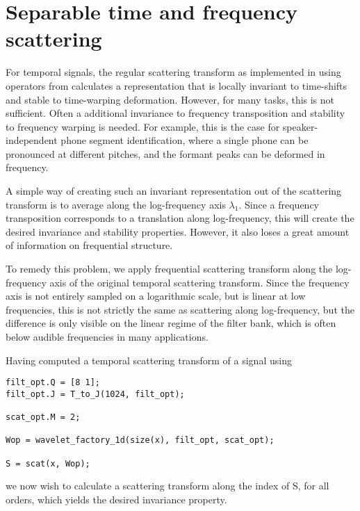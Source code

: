 \documentclass{article}
\begin{document}
\section{Separable time and frequency scattering}
\label{sec:separable-tf}

For temporal signals, the regular scattering transform as implemented in  using operators  from  calculates a representation that is locally invariant to time-shifts and stable to time-warping deformation. However, for many tasks, this is not sufficient. Often a additional invariance to frequency transposition and stability to frequency warping is needed. For example, this is the case for speaker-independent phone segment identification, where a single phone can be pronounced at different pitches, and the formant peaks can be deformed in frequency.

A simple way of creating such an invariant representation out of the scattering transform is to average along the log-frequency axis $\lambda_1$. Since a frequency transposition corresponds to a translation along log-frequency, this will create the desired invariance and stability properties. However, it also loses a great amount of information on frequential structure.

To remedy this problem, we apply frequential scattering transform along the log-frequency axis of the original temporal scattering transform. Since the frequency axis is not entirely sampled on a logarithmic scale, but is linear at low frequencies, this is not strictly the same as scattering along log-frequency, but the difference is only visible on the linear regime of the filter bank, which is often below audible frequencies in many applications.

Having computed a temporal scattering transform of a signal  using
\begin{lstlisting}
filt_opt.Q = [8 1];
filt_opt.J = T_to_J(1024, filt_opt);

scat_opt.M = 2;

Wop = wavelet_factory_1d(size(x), filt_opt, scat_opt);

S = scat(x, Wop);
\end{lstlisting}
we now wish to calculate a scattering transform along the  index of S, for all orders, which yields the desired invariance property.
\end{document}
